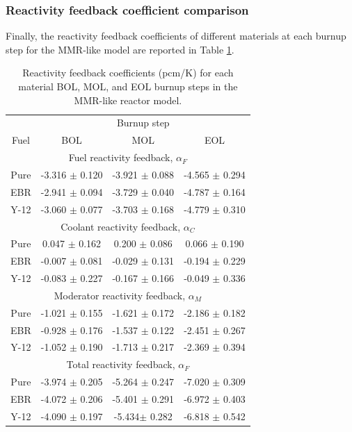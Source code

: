 \subsubsection{Reactivity feedback coefficient comparison} \label{sec:mmr_coeff}
Finally, the reactivity feedback coefficients of different materials 
at each burnup step for the \gls{MMR}-like model are reported in Table \ref{tab:coeff_mmr}. 

\begin{table}[h!]
        \centering 
        \caption{Reactivity feedback coefficients (pcm/K) for each material 
        \gls*{BOL}, \gls*{MOL}, and \gls*{EOL} burnup steps in the \gls*{MMR}-like 
        reactor model.}
        \label{tab:coeff_mmr}
        \begin{tabular}{c c c c}
                \hline 
                & \multicolumn{3}{c}{Burnup step} \\
                Fuel & \gls*{BOL} & \gls*{MOL} & \gls*{EOL} \\
                \hline 
                \multicolumn{4}{c}{Fuel reactivity feedback, $\alpha_F$}\\
                Pure & -3.316 $\pm$ 0.120 & -3.921 $\pm$ 0.088 & -4.565 $\pm$ 0.294\\
                \gls*{EBR} & -2.941 $\pm$ 0.094 & -3.729 $\pm$ 0.040 & -4.787 $\pm$ 0.164\\
                Y-12 & -3.060 $\pm$ 0.077 & -3.703 $\pm$ 0.168 & -4.779 $\pm$ 0.310\\
                \multicolumn{4}{c}{Coolant reactivity feedback, $\alpha_C$}\\
                Pure & 0.047 $\pm$ 0.162 & 0.200 $\pm$ 0.086 & 0.066 $\pm$ 0.190\\
                \gls*{EBR} & -0.007 $\pm$ 0.081 & -0.029 $\pm$ 0.131 & -0.194 $\pm$ 0.229\\
                Y-12 & -0.083 $\pm$ 0.227 & -0.167 $\pm$ 0.166 & -0.049 $\pm$ 0.336\\
                \multicolumn{4}{c}{Moderator reactivity feedback, $\alpha_M$}\\
                Pure & -1.021 $\pm$ 0.155 & -1.621 $\pm$ 0.172 & -2.186 $\pm$ 0.182\\
                \gls*{EBR} & -0.928 $\pm$ 0.176 & -1.537 $\pm$ 0.122 & -2.451 $\pm$ 0.267\\
                Y-12 & -1.052 $\pm$ 0.190 & -1.713 $\pm$ 0.217 & -2.369 $\pm$ 0.394\\
                \multicolumn{4}{c}{Total reactivity feedback, $\alpha_F$}\\
                Pure & -3.974 $\pm$ 0.205 & -5.264 $\pm$ 0.247 & -7.020 $\pm$ 0.309\\
                \gls*{EBR} & -4.072 $\pm$ 0.206 & -5.401 $\pm$ 0.291 & -6.972 $\pm$ 0.403\\
                Y-12 & -4.090 $\pm$ 0.197 & -5.434$\pm$ 0.282 & -6.818 $\pm$ 0.542\\
                \hline 
                
                
        \end{tabular}
\end{table}


